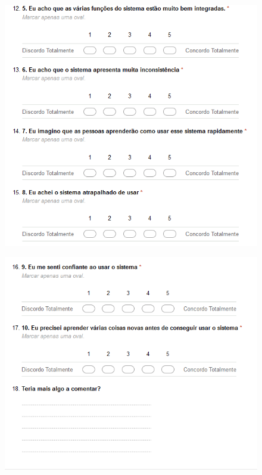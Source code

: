 \documentclass[
	12pt,				%
	openany,			%
	oneside,			%
	a4paper,			%
	english,			%
	french,				%
	spanish,			%
	brazil				%
	]{abntex2}
\begin{document}
\begin{apendicesenv}
\begin{figure}[H]
\end{figure}

\begin{figure}[H]
    \centering

\includegraphics[width=17cm]{figuras/4.png}
\par

\end{figure}

\begin{figure}[H]
    \centering

\includegraphics[width=17cm]{figuras/5.png}
\par


\end{figure}
\end{apendicesenv}
\end{document}
